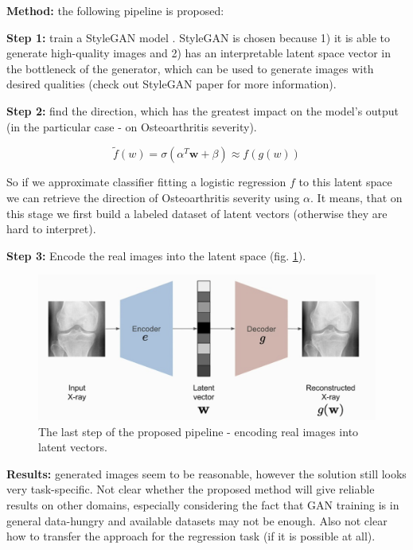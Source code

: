 {\bf Method:} the following pipeline is proposed:

{\bf Step 1:} train a StyleGAN model \cite{KarrasLA19}. StyleGAN is chosen because 1) it is able to generate high-quality images and 2) has an interpretable latent space vector in the bottleneck of the generator, which can be used to generate images with desired qualities (check out StyleGAN paper for more information).

{\bf Step 2:} find the direction, which has the greatest impact on the model's output (in the particular case - on Osteoarthritis severity).

\begin{equation}
    \tilde{f} (w) = \sigma (\alpha^T \textbf{w} + \beta) \approx f(g(w))
\end{equation}

So if we approximate classifier fitting a logistic regression $f$ to this latent space we can retrieve the direction of Osteoarthritis severity using $\alpha$. 
It means, that on this stage we first build a labeled dataset of latent vectors (otherwise they are hard to interpret).

{\bf Step 3:} Encode the real images into the latent space (fig. \ref{fig:encoding_of_real_images}). \\

\begin{figure}[h!]
    \centering
    \includegraphics[scale=0.4]{neurips-2020/images/Screenshot 2020-12-15 at 20.39.44.png}
    \caption{The last step of the proposed pipeline - encoding real images into latent vectors.}
    \label{fig:encoding_of_real_images}
\end{figure}

{\bf Results:} generated images seem to be reasonable, however the solution still looks very task-specific. 
Not clear whether the proposed method will give reliable results on other domains, especially considering the fact that GAN training is in general data-hungry and available datasets may not be enough.
Also not clear how to transfer the approach for the regression task (if it is possible at all).






